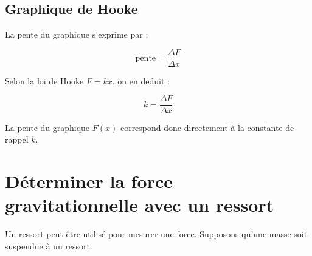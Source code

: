 \documentclass[11pt,openany]{book}
\begin{document}
\subsection{Graphique de Hooke}

\begin{center}
\end{center}

La pente du graphique s'exprime par :

\[
\text{pente} = \frac{\Delta F}{\Delta x}
\]

Selon la loi de Hooke $F = kx$, on en deduit :

\[
\boxed{k = \frac{\Delta F}{\Delta x}}
\]

La pente du graphique $F(x)$ correspond donc directement à la constante de rappel $k$.

\section{Déterminer la force gravitationnelle avec un ressort}

Un ressort peut être utilisé pour mesurer une force. Supposons qu'une masse soit suspendue à un ressort.
\end{document}
